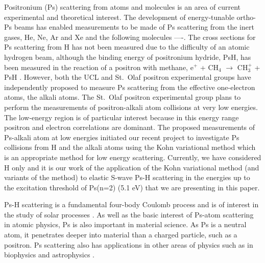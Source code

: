 \documentclass[preprint,showpacs,preprintnumbers,amsmath,amssymb]{revtex4}
\begin{document}
Positronium (Ps) scattering from atoms and molecules is an area of current experimental and theoretical interest. The development of energy-tunable ortho-Ps beams \cite{} has enabled measurements
to be made of Ps scattering from the inert gases, He, Ne, Ar and Xe \cite{} and the following molecules ----. The cross sections for Ps scattering from H has not been measured due to the difficulty
of an atomic hydrogen beam, although the binding energy of positronium hydride, PsH, has been measured in the reaction of a positron with methane, e$^+$ + CH$_4$ $\to$ CH$_3^+$ + PsH \cite{}.
However, both the UCL \cite{} and St.~Olaf \cite{} positron experimental groups have independently proposed to measure  Ps scattering from the effective one-electron atoms, the alkali atoms.
The St.~Olaf positron experimental group  plans to perform the measurements of positron-alkali atom collisions at very low energies. The low-energy region is of particular interest
because in this energy range positron and electron correlations are dominant. The proposed measurements of Ps-alkali atom at low energies initiated our recent project to investigate Ps collisions from
H and the alkali atoms using the Kohn variational method which is an appropriate method for low energy scattering. Currently, we have considered H only and it is our work of the application of the Kohn variational method
(and variants of the method) to elastic S-wave Ps-H scattering in the energies up to the excitation threshold of Ps(n=2) (5.1 eV) that we are presenting in this paper.

Ps-H scattering is a fundamental four-body Coulomb process
and is of interest in the study of solar processes \cite{}.
As well as the basic interest of Ps-atom scattering in atomic physics,
Ps is also important in material science.
As Ps is a neutral atom, it penetrates deeper into material than a charged particle,
such as a positron.
Ps scattering also has applications
in other areas of physics such as in biophysics and astrophysics \cite{}.
\end{document}
